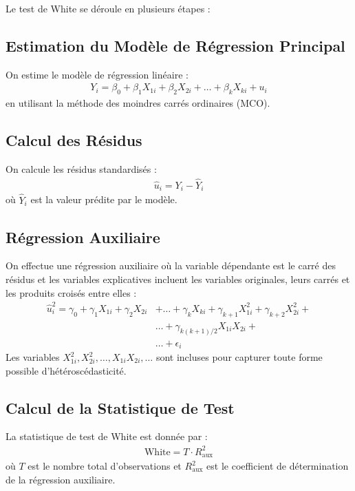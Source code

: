 \documentclass[14pt]{extarticle} %
\theoremstyle{definition}
\theoremstyle{plain}
\begin{document}
Le test de White se déroule en plusieurs étapes :

\subsection{Estimation du Modèle de Régression Principal}

On estime le modèle de régression linéaire :
\begin{align*}
    Y_i = \beta_0 + \beta_1 X_{1i} + \beta_2 X_{2i} + \dots + \beta_k X_{ki} + u_i
\end{align*}
en utilisant la méthode des moindres carrés ordinaires (MCO).

\subsection{Calcul des Résidus}

On calcule les résidus standardisés :
\begin{align*}
    \hat{u}_i = Y_i - \hat{Y}_i
\end{align*}
où $\hat{Y}_i$ est la valeur prédite par le modèle.

\subsection{Régression Auxiliaire}

On effectue une régression auxiliaire où la variable dépendante est le carré des résidus et les variables explicatives incluent les variables originales, leurs carrés et les produits croisés entre elles :
\begin{align*}
    \hat{u}_i^2 = \gamma_0 + \gamma_1 X_{1i} + \gamma_2 X_{2i} & + \dots + \gamma_k X_{ki} + \gamma_{k+1} X_{1i}^2 + \gamma_{k+2} X_{2i}^2 + \\ & \dots + \gamma_{k(k+1)/2} X_{1i}X_{2i} + \\ &\dots + \epsilon_i
\end{align*}
Les variables $X_{1i}^2, X_{2i}^2, \dots, X_{1i}X_{2i}, \dots$ sont incluses pour capturer toute forme possible d'hétéroscédasticité.

\subsection{Calcul de la Statistique de Test}

La statistique de test de White est donnée par :
\begin{align*}
    \text{White} = T \cdot R^2_{\text{aux}}
\end{align*}
où $T$ est le nombre total d'observations et $R^2_{\text{aux}}$ est le coefficient de détermination de la régression auxiliaire.
\end{document}
